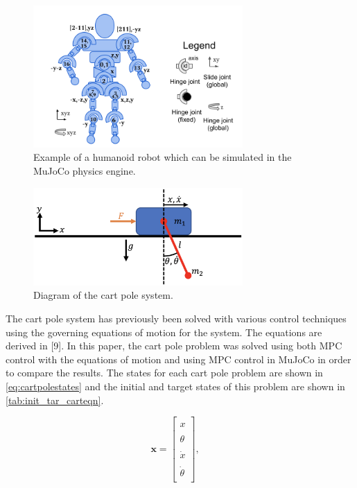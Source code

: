 \documentclass{./springer/svjour3}
\newcommand{\mb}[1]{\mathbf{#1}}
\begin{document}
\begin{figure}[!h]
  \centering
  \includegraphics[width=8cm]{./figures/humanoid.png}
  \caption{Example of a humanoid robot which can be simulated in the MuJoCo physics engine.}
  \label{fig:humanoid} 
\end{figure}

\begin{figure}[!h]
  \centering
  \includegraphics[width=8cm]{./figures/cartpole-dynamics.png}
  \caption{Diagram of the cart pole system.}
  \label{fig:cartpole} 
\end{figure}

The cart pole system has previously been solved with various control techniques using the governing equations of motion for the system. The equations are derived in [9]. In this
paper, the cart pole problem was solved using both MPC control with the equations of motion and using MPC control in MuJoCo in order to compare the results.
The states for each cart pole problem are shown in \ref{eq:cartpolestates} and the initial and target states of this problem are shown in
\ref{tab:init_tar_carteqn}.

\begin{equation}
  \mb{x} = 
  \begin{bmatrix}
  \\x\\
  \\\theta\\
  \\\dot{x}\\
  \\\dot{\theta}\\
  \end{bmatrix}, \quad
  \label{eq:cartpolestates}
\end{equation}
\end{document}
